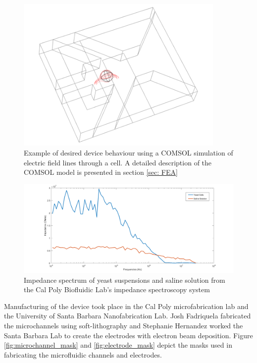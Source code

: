 \begin{figure}[h]
    \centering
    \includegraphics[width=0.9\textwidth]{images/josh_steph_sim.png}
    \caption[Example of desired device behaviour using a COMSOL simulation of electric field lines through a cell.]{Example of desired device behaviour using a COMSOL simulation of electric field lines through a cell. A detailed description of the COMSOL model is presented in section \ref{sec: FEA}}
    \label{fig:josh-steph_sim}
\end{figure}


\begin{figure}[h]
    \centering
    \includegraphics[width=\textwidth]{images/stephanie_impedance_data.png}
    \caption[Impedance spectrum of yeast suspensions and saline solution from the Cal Poly Biofluidic Lab's impedance spectroscopy system]{Impedance spectrum of yeast suspensions and saline solution from the Cal Poly Biofluidic Lab's impedance spectroscopy system \cite{hernandez_single_2009-1}}
    \label{fig:stephanie_impedance_data}
\end{figure}

\par Manufacturing of the device took place in the Cal Poly microfabrication lab and the University of Santa Barbara Nanofabrication Lab. Josh Fadriquela fabricated the microchannels using soft-lithography and Stephanie Hernandez worked the Santa Barbara Lab to create the electrodes with electron beam deposition. Figure \ref{fig:microchannel_mask} and \ref{fig:electrode_mask} depict the masks used in fabricating the microfluidic channels and electrodes.

